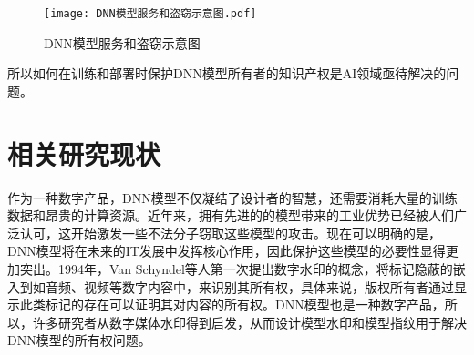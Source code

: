 \begin{figure}[htbp]%
	\centering
	\setlength{\abovecaptionskip}{5mm} %
	\vspace{-2mm}
	\setlength{\belowcaptionskip}{-3mm} %
	\texttt{[image: DNN模型服务和盗窃示意图.pdf]}
	\caption{DNN模型服务和盗窃示意图}
	\label{DNN模型服务和盗窃示意图}
	\end {figure}
	
所以如何在训练和部署时保护DNN模型所有者的知识产权是AI领域亟待解决的问题。


\section{相关研究现状}

作为一种数字产品，DNN模型不仅凝结了设计者的智慧，还需要消耗大量的训练数据和昂贵的计算资源。近年来，拥有先进的的模型带来的工业优势已经被人们广泛认可，这开始激发一些不法分子窃取这些模型的攻击\cite{tramer2016stealing,duddu2018stealing}。现在可以明确的是，DNN模型将在未来的IT发展中发挥核心作用，因此保护这些模型的必要性显得更加突出。1994年，Van Schyndel等人\cite{van1994digital}第一次提出数字水印的概念，将标记隐蔽的嵌入到如音频、视频等数字内容中，来识别其所有权，具体来说，版权所有者通过显示此类标记的存在可以证明其对内容的所有权。DNN模型也是一种数字产品，所以，许多研究者从数字媒体水印得到启发，从而设计模型水印和模型指纹用于解决DNN模型的所有权问题。


